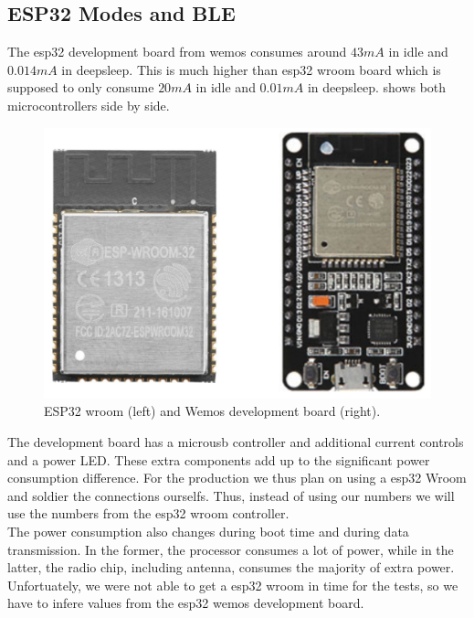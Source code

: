 \subsection{ESP32 Modes and BLE}
The esp32 development board from wemos consumes around $43mA$ in idle and $0.014mA$ in deepsleep. This is much higher than esp32 wroom board which is supposed to only consume $20mA$ in idle and $0.01mA$ in deepsleep\cite{InsightI15esp32ModesWroom:online}.  shows both microcontrollers side by side. 

\begin{figure}[h!]
    \centering
    \includegraphics[scale=0.4]{figures/esp32WroomWemos.png}%
    \caption{ESP32 wroom (left) and Wemos development board (right).}\label{fig:esp32Comp}
\end{figure}



The development board has a microusb controller and additional current controls and a power LED. These extra components add up to the significant power consumption difference. For the production we thus plan on using a esp32 Wroom and soldier the connections ourselfs. Thus, instead of using our numbers we will use the numbers from the esp32 wroom controller\cite{InsightI15esp32ModesWroom:online}.\\

The power consumption also changes during boot time and during data transmission. In the former, the processor consumes a lot of power, while in the latter, the radio chip, including antenna, consumes the majority of extra power. Unfortuately, we were not able to get a esp32 wroom in time for the tests, so we have to infere values from the esp32 wemos development board. \\

